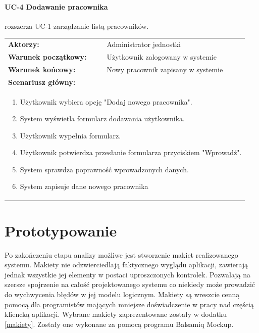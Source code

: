 \paragraph{UC-4 Dodawanie pracownika}
rozszerza UC-1 zarządzanie listą pracowników.\\
\begin{tabular}{ll}
	\textbf{Aktorzy:} & Administrator jednostki \\
	
	\textbf{Warunek początkowy:} & Użytkownik zalogowany w systemie \\
	\textbf{Warunek końcowy:} & Nowy pracownik zapisany w systemie \\
	\multicolumn{2}{l}{\textbf{Scenariusz główny:}}\\
	\multicolumn{2}{l}{
	\begin{minipage}{\textwidth}\begin{enumerate}
		\item Użytkownik wybiera opcję "Dodaj nowego pracownika".
		\item System wyświetla formularz dodawania użytkownika.
		\item Użytkownik wypełnia formularz.
		\item Użytkownik potwierdza przesłanie formularza przyciskiem "Wprowadź".
		\item System sprawdza poprawność wprowadzonych danych.
		\item System zapisuje dane nowego pracownika
	\end{enumerate}\end{minipage}
	}
\end{tabular}
	
\section[Prototypowanie][Prototypowanie]{Prototypowanie}
Po zakończeniu etapu analizy możliwe jest stworzenie makiet realizowanego systemu. Makiety nie odzwierciedlają faktycznego wyglądu aplikacji, zawierają jednak wszystkie jej elementy w postaci uproszczonych kontrolek. Pozwalają na szersze spojrzenie na całość projektowanego systemu co niekiedy może prowadzić do wychwycenia błędów w jej modelu logicznym. Makiety są wreszcie cenną pomocą dla programistów mających mniejsze doświadczenie w pracy nad częścią kliencką aplikacji. Wybrane makiety zaprezentowane zostały w dodatku \ref{makiety}. Zostały one wykonane za pomocą programu Balsamiq Mockup.


